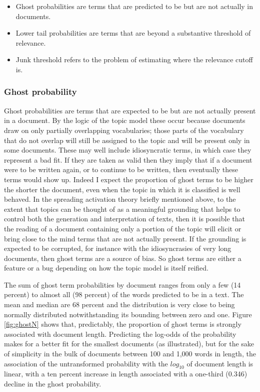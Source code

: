 \documentclass[]{book}
\providecommand{\tightlist}{%
  \setlength{\itemsep}{0pt}\setlength{\parskip}{0pt}}
\theoremstyle{definition}
\theoremstyle{definition}
\theoremstyle{definition}
\theoremstyle{remark}
\begin{document}
\begin{itemize}
\tightlist
\item
  Ghost probabilities are terms that are predicted to be but are not
  actually in documents.
\item
  Lower tail probabilities are terms that are beyond a substantive
  threshold of relevance.
\item
  Junk threshold refers to the problem of estimating where the relevance
  cutoff is.
\end{itemize}

\hypertarget{ghost-probability}{%
\subsubsection{Ghost probability}\label{ghost-probability}}

Ghost probabilities are terms that are expected to be but are not
actually present in a document. By the logic of the topic model these
occur because documents draw on only partially overlapping vocabularies;
those parts of the vocabulary that do not overlap will still be assigned
to the topic and will be present only in some documents. These may well
include idiosyncratic terms, in which case they represent a bad fit. If
they are taken as valid then they imply that if a document were to be
written again, or to continue to be written, then eventually these terms
would show up. Indeed I expect the proportion of ghost terms to be
higher the shorter the document, even when the topic in which it is
classified is well behaved. In the spreading activation theory briefly
mentioned above, to the extent that topics can be thought of as a
meaningful grounding that helps to control both the generation and
interpretation of texts, then it is possible that the reading of a
document containing only a portion of the topic will elicit or bring
close to the mind terms that are not actually present. If the grounding
is expected to be corrupted, for instance with the idiosyncrasies of
very long documents, then ghost terms are a source of bias. So ghost
terms are either a feature or a bug depending on how the topic model is
itself reified.

The sum of ghost term probabilities by document ranges from only a few
(14 percent) to almost all (98 percent) of the words predicted to be in
a text. The mean and median are 68 percent and the distribution is very
close to being normally distributed notwithstanding its bounding between
zero and one. Figure \ref{fig:ghostN} shows that, predictably, the
proportion of ghost terms is strongly associated with document length.
Predicting the log-odds of the probability makes for a better fit for
the smallest documents (as illustrated), but for the sake of simplicity
in the bulk of documents between 100 and 1,000 words in length, the
association of the untransformed probability with the \(log_{10}\) of
document length is linear, with a ten percent increase in length
associated with a one-third (0.346) decline in the ghost probability.
\end{document}
